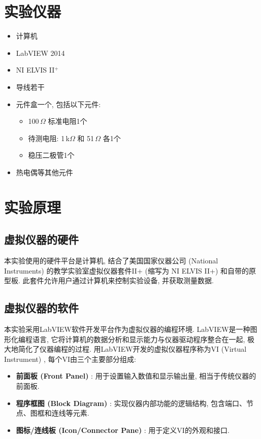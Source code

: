 \documentclass[zihao=5, UTF8]{article}
\theoremstyle{MyLineTheoremStyle} %
\theoremstyle{MyBlockTheoremStyle} %
\theoremstyle{MySubsubsectionStyle} %
\begin{document}
\section{实验仪器}

\begin{itemize}
    \item 计算机
    \item LabVIEW 2014
    \item NI ELVIS II$^+$
    \item 导线若干
    \item 元件盒一个, 包括以下元件:
        \begin{itemize}
            \item 100\,$\Omega$ 标准电阻1个
            \item 待测电阻: 1\,k$\Omega$ 和 51\,$\Omega$ 各1个
            \item 稳压二极管1个
        \end{itemize}
    \item 热电偶等其他元件
\end{itemize}

\section{实验原理}

\subsection{虚拟仪器的硬件}
本实验使用的硬件平台是计算机, 结合了美国国家仪器公司 (National Instruments) 的教学实验室虚拟仪器套件II+ (缩写为 NI ELVIS II+) 和自带的原型板. 此套件允许用户通过计算机来控制实验设备, 并获取测量数据.

\subsection{虚拟仪器的软件}
本实验采用LabVIEW软件开发平台作为虚拟仪器的编程环境. LabVIEW是一种图形化编程语言, 它将计算机的数据分析和显示能力与仪器驱动程序整合在一起, 极大地简化了仪器编程的过程. 用LabVIEW开发的虚拟仪器程序称为VI (Virtual Instrument) , 每个VI由三个主要部分组成:
\begin{itemize}
    \item \textbf{前面板 (Front Panel) }: 用于设置输入数值和显示输出量, 相当于传统仪器的前面板.
    \item \textbf{程序框图 (Block Diagram) }: 实现仪器内部功能的逻辑结构, 包含端口、节点、图框和连线等元素.
    \item \textbf{图标/连线板 (Icon/Connector Pane) }: 用于定义VI的外观和接口.
\end{itemize}
\end{document}
